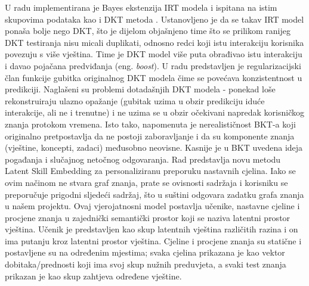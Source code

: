 \documentclass{report}
\begin{document}
\newline
\newline
U radu \citep{ct4} implementirana je Bayes ekstenzija IRT modela i ispitana na istim skupovima podataka kao i DKT metoda \cite{ct2}. Ustanovljeno je da se takav IRT model ponaša bolje nego DKT, što je dijelom objašnjeno time što se prilikom ranijeg DKT testiranja nisu micali duplikati, odnosno redci koji istu interakciju korisnika povezuju s više vještina. Time je DKT model više puta obrađivao istu interakciju i davao pojačana predviđanja (eng. \textit{boost}).
\newline
\newline
U radu \citep{ct5} predstavljen je regularizacijski član funkcije gubitka originalnog DKT modela čime se povećava konzistentnost u predikciji. Naglašeni su problemi dotadašnjih DKT modela - ponekad loše rekonstruiraju ulazno opažanje (gubitak uzima u obzir predikciju iduće interakcije, ali ne i trenutne) i ne uzima se u obzir očekivani napredak korisničkog znanja protokom vremena. Isto tako, napomenuta je nerealističnost BKT-a koji originalno pretpostavlja da ne postoji zaboravljanje i da su komponente znanja (vještine, koncepti, zadaci) međusobno neovisne. Kasnije je u BKT uvedena ideja pogađanja i slučajnog netočnog odgovaranja.
\newline  
\newline
Rad \citep{ct6} predstavlja novu metodu Latent Skill Embedding za personaliziranu preporuku nastavnih cjelina. Iako se ovim načinom ne stvara graf znanja, prate se ovisnosti sadržaja i korisniku se preporučuje prigodni sljedeći sadržaj, što u suštini odgovara zadatku grafa znanja u našem projektu. Ovaj vjerojatnosni model postavlja učenike, nastavne cjeline i procjene znanja u zajednički semantički prostor koji se naziva latentni prostor vještina. Učenik je predstavljen kao skup latentnih vještina različitih razina i on ima putanju kroz latentni prostor vještina. Cjeline i procjene znanja su statične i postavljene su na određenim mjestima; svaka cjelina prikazana je kao vektor dobitaka/prednosti koji ima svoj skup nužnih preduvjeta, a svaki test znanja prikazan je kao skup zahtjeva određene vještine.
\end{document}
